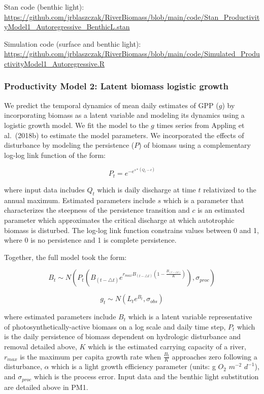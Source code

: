 \documentclass[
]{article}
\begin{document}
Stan code (benthic light):
\url{https://github.com/jrblaszczak/RiverBiomass/blob/main/code/Stan_ProductivityModel1_Autoregressive_BenthicL.stan}

Simulation code (surface and benthic light):
\url{https://github.com/jrblaszczak/RiverBiomass/blob/main/code/Simulated_ProductivityModel1_Autoregressive.R}

\hypertarget{productivity-model-2-latent-biomass-logistic-growth}{%
\subsubsection{Productivity Model 2: Latent biomass logistic
growth}\label{productivity-model-2-latent-biomass-logistic-growth}}

We predict the temporal dynamics of mean daily estimates of GPP (\(g\))
by incorporating biomass as a latent variable and modeling its dynamics
using a logistic growth model. We fit the model to the \(g\) times
series from Appling et al.~(2018b) to estimate the model parameters. We
incorporated the effects of disturbance by modeling the persistence
(\(P\)) of biomass using a complementary log-log link function of the
form:

\begin{equation}
    P_{t} = e^{-e^{s*(Q_{t} - c)}}
\end{equation}

where input data includes \(Q_t\) which is daily discharge at time \(t\)
relativized to the annual maximum. Estimated parameters include \(s\)
which is a parameter that characterizes the steepness of the persistence
transition and \(c\) is an estimated parameter which approximates the
critical discharge at which autotrophic biomass is disturbed. The
log-log link function constrains values between 0 and 1, where 0 is no
persistence and 1 is complete persistence.

Together, the full model took the form:

\begin{equation}
    B_{t} \sim N(P_{t}(B_{(t-\triangle t)} e^{r_{max}B_{(t-\triangle t)}(1-\frac{B_{(t-\triangle t)}}{K})}), \sigma_{proc})
\end{equation}

\begin{equation}
    g_{t} \sim N(L_{t} e^{B_{t}}, \sigma_{obs})
\end{equation}

where estimated parameters include \(B_{t}\) which is a latent variable
representative of photosynthetically-active biomass on a log scale and
daily time step, \(P_{t}\) which is the daily persistence of biomass
dependent on hydrologic disturbance and removal detailed above, \(K\)
which is the estimated carrying capacity of a river, \(r_{max}\) is the
maximum per capita growth rate when \(\frac {B_t}{K}\) approaches zero
following a disturbance, \(\alpha\) which is a light growth efficiency
parameter (units: g \(O_2\) \(m^{-2}\) \(d^{-1}\)), and
\(\sigma_{proc}\) which is the process error. Input data and the benthic
light substitution are detailed above in PM1.
\end{document}
